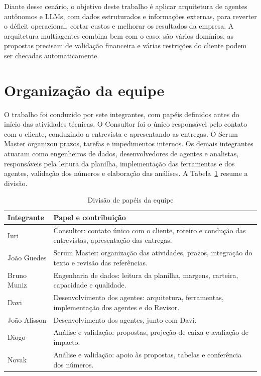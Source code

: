 \documentclass[12pt,a4paper,oneside,brazil]{abntex2}
\begin{document}
Diante desse cenário, o objetivo deste trabalho é aplicar arquitetura de agentes autônomos e LLMs, com dados estruturados e informações externas, para reverter o déficit operacional, cortar custos e melhorar os resultados da empresa. A arquitetura multiagentes combina bem com o caso: são vários domínios, as propostas precisam de validação financeira e várias restrições do cliente podem ser checadas automaticamente.

\section{Organização da equipe}

O trabalho foi conduzido por sete integrantes, com papéis definidos antes do início das atividades técnicas. O Consultor foi o único responsável pelo contato com o cliente, conduzindo a entrevista e apresentando as entregas. O Scrum Master organizou prazos, tarefas e impedimentos internos. Os demais integrantes atuaram como engenheiros de dados, desenvolvedores de agentes e analistas, responsáveis pela leitura da planilha, implementação das ferramentas e dos agentes, validação dos números e elaboração das análises. A Tabela~\ref{tab:equipe} resume a divisão.

\begin{table}[htb]
\caption{Divisão de papéis da equipe}
\label{tab:equipe}
\centering\small
\begin{tabular}{@{}p{}p{}@{}}
\toprule
\textbf{Integrante} & \textbf{Papel e contribuição} \\
\midrule
Iuri & Consultor: contato único com o cliente, roteiro e condução das entrevistas, apresentação das entregas. \\
João Guedes & Scrum Master: organização das atividades, prazos, integração do texto e revisão das referências. \\
Bruno Muniz & Engenharia de dados: leitura da planilha, margens, carteira, capacidade e qualidade. \\
Davi & Desenvolvimento dos agentes: arquitetura, ferramentas, implementação dos agentes e do Revisor. \\
João Alisson & Desenvolvimento dos agentes, junto com Davi. \\
Diogo & Análise e validação: propostas, projeção de caixa e avaliação de impacto. \\
Novak & Análise e validação: apoio às propostas, tabelas e conferência dos números. \\
\bottomrule
\end{tabular}
\end{table}
\end{document}

